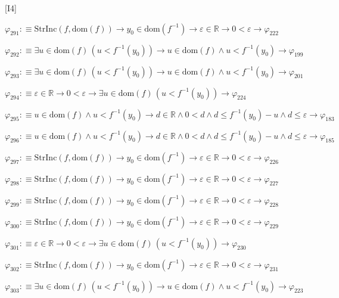\begin{fullproof}{[I4]}
\begin{abbrevlist}
\item $\varphi_{291} :\equiv \mathrm{StrInc}(f,\mathrm{dom}(f)) \to y_{0} \in \mathrm{dom}(f^{-1}) \to \varepsilon \in \mathbb{R} \to 0 < \varepsilon \to \varphi_{222}$
\item $\varphi_{292} :\equiv \exists u \in \mathrm{dom}(f)\,(u < f^{-1}(y_{0})) \to u \in \mathrm{dom}(f) \land u < f^{-1}(y_{0}) \to \varphi_{199}$
\item $\varphi_{293} :\equiv \exists u \in \mathrm{dom}(f)\,(u < f^{-1}(y_{0})) \to u \in \mathrm{dom}(f) \land u < f^{-1}(y_{0}) \to \varphi_{201}$
\item $\varphi_{294} :\equiv \varepsilon \in \mathbb{R} \to 0 < \varepsilon \to \exists u \in \mathrm{dom}(f)\,(u < f^{-1}(y_{0})) \to \varphi_{224}$
\item $\varphi_{295} :\equiv u \in \mathrm{dom}(f) \land u < f^{-1}(y_{0}) \to d \in \mathbb{R} \land 0 < d \land d \leq f^{-1}(y_{0}) - u \land d \leq \varepsilon \to \varphi_{183}$
\item $\varphi_{296} :\equiv u \in \mathrm{dom}(f) \land u < f^{-1}(y_{0}) \to d \in \mathbb{R} \land 0 < d \land d \leq f^{-1}(y_{0}) - u \land d \leq \varepsilon \to \varphi_{185}$
\item $\varphi_{297} :\equiv \mathrm{StrInc}(f,\mathrm{dom}(f)) \to y_{0} \in \mathrm{dom}(f^{-1}) \to \varepsilon \in \mathbb{R} \to 0 < \varepsilon \to \varphi_{226}$
\item $\varphi_{298} :\equiv \mathrm{StrInc}(f,\mathrm{dom}(f)) \to y_{0} \in \mathrm{dom}(f^{-1}) \to \varepsilon \in \mathbb{R} \to 0 < \varepsilon \to \varphi_{227}$
\item $\varphi_{299} :\equiv \mathrm{StrInc}(f,\mathrm{dom}(f)) \to y_{0} \in \mathrm{dom}(f^{-1}) \to \varepsilon \in \mathbb{R} \to 0 < \varepsilon \to \varphi_{228}$
\item $\varphi_{300} :\equiv \mathrm{StrInc}(f,\mathrm{dom}(f)) \to y_{0} \in \mathrm{dom}(f^{-1}) \to \varepsilon \in \mathbb{R} \to 0 < \varepsilon \to \varphi_{229}$
\item $\varphi_{301} :\equiv \varepsilon \in \mathbb{R} \to 0 < \varepsilon \to \exists u \in \mathrm{dom}(f)\,(u < f^{-1}(y_{0})) \to \varphi_{230}$
\item $\varphi_{302} :\equiv \mathrm{StrInc}(f,\mathrm{dom}(f)) \to y_{0} \in \mathrm{dom}(f^{-1}) \to \varepsilon \in \mathbb{R} \to 0 < \varepsilon \to \varphi_{231}$
\item $\varphi_{303} :\equiv \exists u \in \mathrm{dom}(f)\,(u < f^{-1}(y_{0})) \to u \in \mathrm{dom}(f) \land u < f^{-1}(y_{0}) \to \varphi_{223}$

\end{abbrevlist}
\end{fullproof}
